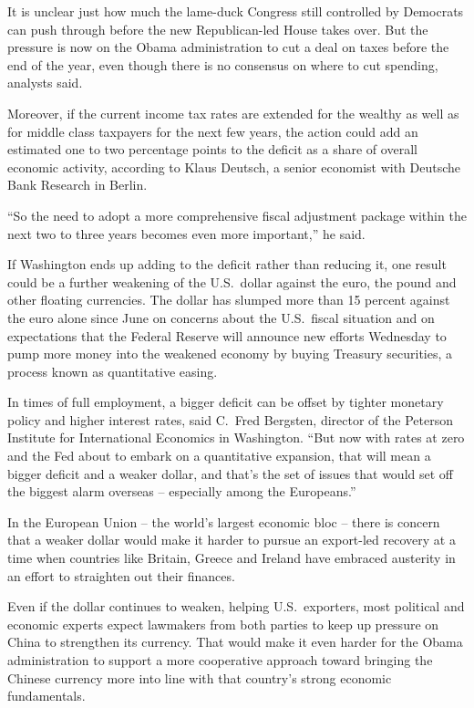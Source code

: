 ﻿\documentclass[12pt]{article}
\begin{document}
It is unclear just how much the lame-duck Congress still controlled by Democrats can push through
before the new Republican-led House takes over. But the pressure is now on the Obama administration
to cut a deal on taxes before the end of the year, even though there is no consensus on where to cut
spending, analysts said.

Moreover, if the current income tax rates are extended for the wealthy as well as for middle class
taxpayers for the next few years, the action could add an estimated one to two percentage points to
the deficit as a share of overall economic activity, according to Klaus Deutsch, a senior economist
with Deutsche Bank Research in Berlin.

``So the need to adopt a more comprehensive fiscal adjustment package within the next two to three
years becomes even more important,'' he said.

If Washington ends up adding to the deficit rather than reducing it, one result could be a further
weakening of the U.S.~dollar against the euro, the pound and other floating currencies. The dollar
has slumped more than 15 percent against the euro alone since June on concerns about the U.S.~fiscal
situation and on expectations that the Federal Reserve will announce new efforts Wednesday to pump
more money into the weakened economy by buying Treasury securities, a process known as quantitative
easing.

In times of full employment, a bigger deficit can be offset by tighter monetary policy and higher
interest rates, said C.~Fred Bergsten, director of the Peterson Institute for International
Economics in Washington. ``But now with rates at zero and the Fed about to embark on a quantitative
expansion, that will mean a bigger deficit and a weaker dollar, and that's the set of issues that
would set off the biggest alarm overseas -- especially among the Europeans.''

In the European Union -- the world's largest economic bloc -- there is concern that a weaker dollar
would make it harder to pursue an export-led recovery at a time when countries like Britain, Greece
and Ireland have embraced austerity in an effort to straighten out their finances.

Even if the dollar continues to weaken, helping U.S.~exporters, most political and economic experts
expect lawmakers from both parties to keep up pressure on China to strengthen its currency. That
would make it even harder for the Obama administration to support a more cooperative approach toward
bringing the Chinese currency more into line with that country's strong economic fundamentals.
\end{document}
